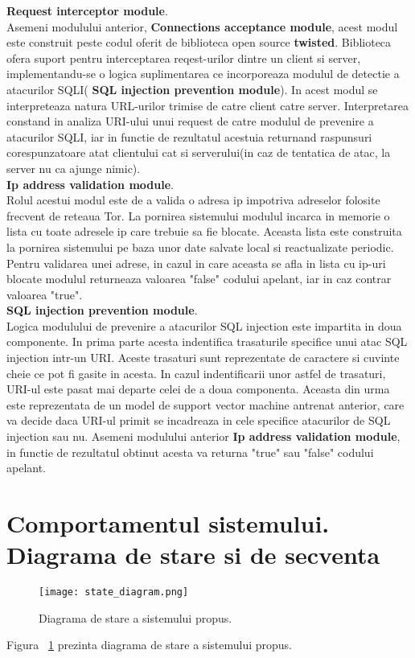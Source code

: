  \textbf{Request interceptor module}.\\
 
 Asemeni modulului anterior, \textbf{Connections acceptance module}, acest modul este construit peste codul oferit de biblioteca open source \textbf{twisted}. Biblioteca ofera suport pentru interceptarea reqest-urilor dintre un client si server, implementandu-se o logica suplimentarea ce incorporeaza modulul de detectie a atacurilor SQLI( \textbf{SQL injection prevention module}). In acest modul se interpreteaza natura URL-urilor trimise de catre client catre server.
 Interpretarea constand in analiza URI-ului unui request de catre modulul de prevenire a atacurilor SQLI, iar in functie de rezultatul acestuia returnand raspunsuri corespunzatoare atat clientului cat si serverului(in caz de tentatica de atac, la server nu ca ajunge nimic). \\
 
\textbf{Ip address validation module}. \\

Rolul acestui modul este de a valida o adresa ip impotriva adreselor folosite frecvent de reteaua Tor. La pornirea sistemului modulul incarca in memorie o lista cu toate adresele ip care trebuie sa fie blocate. Aceasta lista este construita la pornirea sistemului pe baza unor date salvate local si reactualizate periodic. Pentru validarea unei adrese, in cazul in care aceasta se afla in lista cu ip-uri blocate modulul returneaza valoarea "false" codului apelant, iar in caz contrar valoarea "true". \\

 \textbf{SQL injection prevention module}. \\
  
 Logica modulului de prevenire a atacurilor SQL injection este impartita in doua componente. In prima parte acesta indentifica trasaturile specifice unui atac SQL injection intr-un URI. Aceste trasaturi sunt reprezentate de caractere si cuvinte cheie ce pot fi gasite in acesta. In cazul indentificarii unor astfel de trasaturi, URI-ul este pasat mai departe celei de a doua componenta. Aceasta din urma este reprezentata de un model de support vector machine antrenat anterior, care va decide daca URI-ul primit se incadreaza in cele specifice atacurilor de SQL injection sau nu. Asemeni modulului anterior \textbf{Ip address validation module}, in functie de rezultatul obtinut acesta va returna "true" sau "false" codului apelant.

\section{Comportamentul sistemului. Diagrama de stare si de secventa}
\begin{figure}[h]
	\centering
	\texttt{[image: state\_diagram.png]}
	\caption{Diagrama de stare a sistemului propus.}
	\label{fig:state}
\end{figure}
Figura ~\ref{fig:state} prezinta diagrama de stare a sistemului propus.

